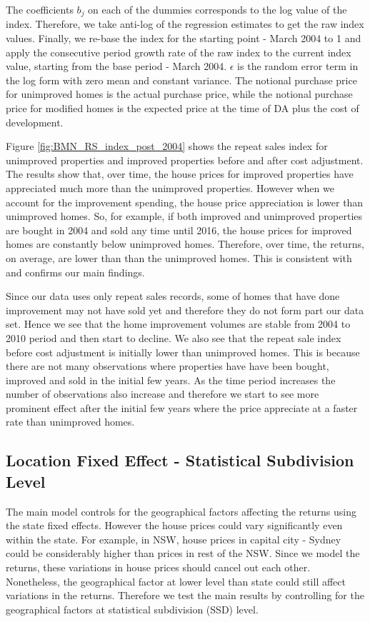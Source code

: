 \documentclass{article}
\begin{document}
The coefficients $b_j$ on each of the dummies corresponds to the log value of the index. Therefore, we take anti-log of the regression estimates to get the raw index values. Finally, we re-base the index for the starting point - March 2004 to 1 and apply the consecutive period growth rate of the raw index to the current index value, starting from the base period - March 2004.  $\epsilon$ is the random error term in the log form with zero mean and constant variance. The notional purchase price for unimproved homes is the actual purchase price, while the notional purchase price for modified homes is the expected price at the time of DA plus the cost of development. 

%
Figure \ref{fig:BMN_RS_index_post_2004} shows the repeat sales index for unimproved properties and improved properties before and after cost adjustment. The results show that, over time, the house prices for improved properties have appreciated much more than the unimproved properties. However when we account for the improvement spending, the house price appreciation is lower than unimproved homes. So, for example, if both improved and unimproved properties are bought in 2004 and sold any time until 2016, the house prices for improved homes are constantly below unimproved homes. Therefore, over time, the returns, on average, are lower than than the unimproved homes. This is consistent with and confirms our main findings.

Since our data uses only repeat sales records, some of homes that have done improvement may not have sold yet and therefore they do not form part our data set. Hence we see that the home improvement volumes are stable from 2004 to 2010 period and then start to decline. We also see that the repeat sale index before cost adjustment is initially lower than unimproved homes. This is because there are not many observations where properties have have been bought, improved and sold in the initial few years. As the time period increases the number of observations also increase and therefore we start to see more prominent effect after the initial few years where the price appreciate at a faster rate than unimproved homes.

  
\subsection{Location Fixed Effect - Statistical Subdivision Level}

The main model controls for the geographical factors affecting the returns using the state fixed effects. However the house prices could vary significantly even within the state. For example, in NSW, house prices in capital city - Sydney could be considerably higher than prices in rest of the NSW. Since we model the returns, these variations in house prices should cancel out each other. Nonetheless, the geographical factor at lower level than state could still affect variations in the returns. Therefore we test the main results by controlling for the geographical factors at statistical subdivision (SSD) level.
\end{document}
